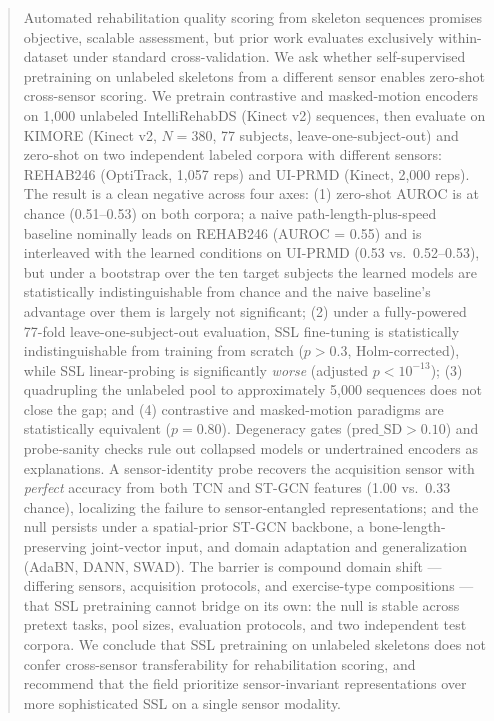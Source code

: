 \documentclass[10pt,journal]{IEEEtran}
\begin{document}
\begin{abstract}
Automated rehabilitation quality scoring from skeleton sequences promises objective, scalable assessment, but prior work evaluates exclusively within-dataset under standard cross-validation. We ask whether self-supervised pretraining on unlabeled skeletons from a different sensor enables zero-shot cross-sensor scoring. We pretrain contrastive and masked-motion encoders on 1,000 unlabeled IntelliRehabDS (Kinect v2) sequences, then evaluate on KIMORE (Kinect v2, $N=380$, 77 subjects, leave-one-subject-out) and zero-shot on two independent labeled corpora with different sensors: REHAB246 (OptiTrack, 1,057 reps) and UI-PRMD (Kinect, 2,000 reps). The result is a clean negative across four axes:
(1) zero-shot AUROC is at chance (0.51--0.53) on both corpora; a naive path-length-plus-speed baseline nominally leads on REHAB246 (AUROC = 0.55) and is interleaved with the learned conditions on UI-PRMD (0.53 vs.\ 0.52--0.53), but under a bootstrap over the ten target subjects the learned models are statistically indistinguishable from chance and the naive baseline's advantage over them is largely not significant;
(2) under a fully-powered 77-fold leave-one-subject-out evaluation, SSL fine-tuning is statistically indistinguishable from training from scratch ($p > 0.3$, Holm-corrected), while SSL linear-probing is significantly \emph{worse} (adjusted $p < 10^{-13}$);
(3) quadrupling the unlabeled pool to approximately 5,000 sequences does not close the gap; and
(4) contrastive and masked-motion paradigms are statistically equivalent ($p = 0.80$).
Degeneracy gates ($\text{pred\_SD} > 0.10$) and probe-sanity checks rule out collapsed models or undertrained encoders as explanations. A sensor-identity probe recovers the acquisition sensor with \emph{perfect} accuracy from both TCN and ST-GCN features (1.00 vs.\ 0.33 chance), localizing the failure to sensor-entangled representations; and the null persists under a spatial-prior ST-GCN backbone, a bone-length-preserving joint-vector input, and domain adaptation and generalization (AdaBN, DANN, SWAD).
The barrier is compound domain shift --- differing sensors, acquisition protocols, and exercise-type compositions --- that SSL pretraining cannot bridge on its own: the null is stable across pretext tasks, pool sizes, evaluation protocols, and two independent test corpora.
We conclude that SSL pretraining on unlabeled skeletons does not confer cross-sensor transferability for rehabilitation scoring, and recommend that the field prioritize sensor-invariant representations over more sophisticated SSL on a single sensor modality.
\end{abstract}
\end{document}
